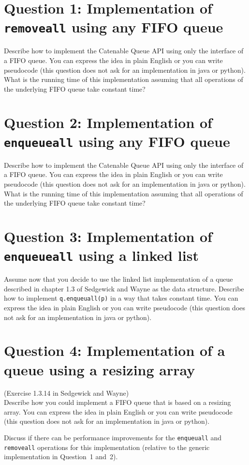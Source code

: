 \documentclass{tufte-handout}
\begin{document}
\section{\textbf{Question 1}: Implementation of \texttt{removeall} using any FIFO queue}

Describe how to implement the Catenable Queue API using only the interface of a FIFO queue.
You can express the idea in plain English or you can write pseudocode (this question does not ask for an implementation in java or python).
What is the running time of this implementation assuming that all operations of the underlying FIFO queue take constant time?

\section{\textbf{Question 2}: Implementation of \texttt{enqueueall} using any FIFO queue}


Describe how to implement the Catenable Queue API using only the interface of a FIFO queue.
You can express the idea in plain English or you can write pseudocode (this question does not ask for an implementation in java or python).
What is the running time of this implementation assuming that all operations of the underlying FIFO queue take constant time?

\section{\textbf{Question 3}: Implementation of \texttt{enqueueall} using a linked list}

Assume now that you decide to use the linked list implementation of a queue described in chapter 1.3 of Sedgewick and Wayne as the data structure.
Describe how to implement \texttt{q.enqueuall(p)} in a way that takes constant time.
You can express the idea in plain English or you can write pseudocode (this question does not ask for an implementation in java or python).

\section{\textbf{Question 4}: Implementation of a queue using a resizing array}


(Exercise 1.3.14 in Sedgewick and Wayne)\\
Describe how you could implement a FIFO queue that is based on a resizing array.
You can express the idea in plain English or you can write pseudocode (this question does not ask for an implementation in java or python).

Discuss if there can be performance improvements for the \texttt{enqueuall} and \texttt{removeall} operations for this implementation (relative to the generic implementation in Question~1 and~2).
\end{document}
